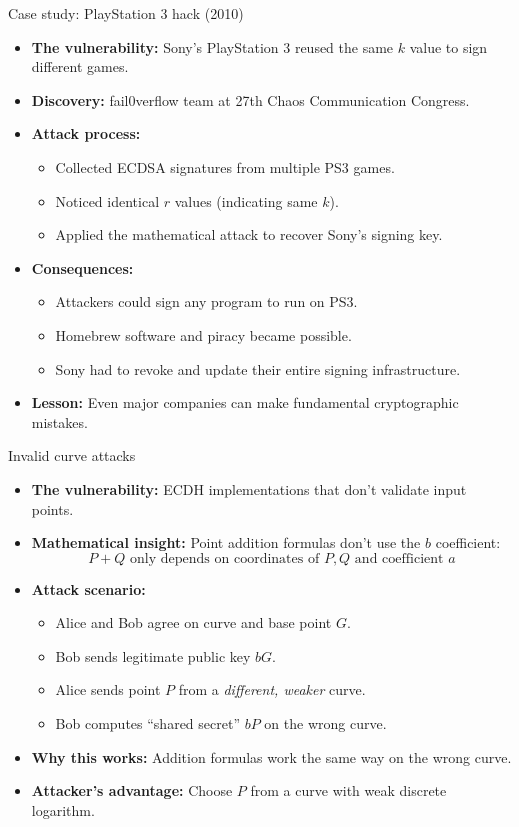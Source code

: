 \documentclass[aspectratio=169, lualatex, handout]{beamer}
\begin{document}
\begin{frame}{Case study: PlayStation 3 hack (2010)}
	\begin{itemize}[<+->]
		\item \textbf{The vulnerability:} Sony's PlayStation 3 reused the same $k$ value to sign different games.
		\item \textbf{Discovery:} fail0verflow team at 27th Chaos Communication Congress.
		\item \textbf{Attack process:}
		      \begin{itemize}
			      \item Collected ECDSA signatures from multiple PS3 games.
			      \item Noticed identical $r$ values (indicating same $k$).
			      \item Applied the mathematical attack to recover Sony's signing key.
		      \end{itemize}
		\item \textbf{Consequences:}
		      \begin{itemize}
			      \item Attackers could sign any program to run on PS3.
			      \item Homebrew software and piracy became possible.
			      \item Sony had to revoke and update their entire signing infrastructure.
		      \end{itemize}
		\item \textbf{Lesson:} Even major companies can make fundamental cryptographic mistakes.
	\end{itemize}
\end{frame}

\begin{frame}{Invalid curve attacks}
	\begin{itemize}[<+->]
		\item \textbf{The vulnerability:} ECDH implementations that don't validate input points.
		\item \textbf{Mathematical insight:} Point addition formulas don't use the $b$ coefficient:
		      $$P + Q \text{ only depends on coordinates of } P, Q \text{ and coefficient } a$$
		\item \textbf{Attack scenario:}
		      \begin{itemize}
			      \item Alice and Bob agree on curve and base point $G$.
			      \item Bob sends legitimate public key $bG$.
			      \item Alice sends point $P$ from a \emph{different, weaker} curve.
			      \item Bob computes ``shared secret'' $bP$ on the wrong curve.
		      \end{itemize}
		\item \textbf{Why this works:} Addition formulas work the same way on the wrong curve.
		\item \textbf{Attacker's advantage:} Choose $P$ from a curve with weak discrete logarithm.
	\end{itemize}
\end{frame}
\end{document}
